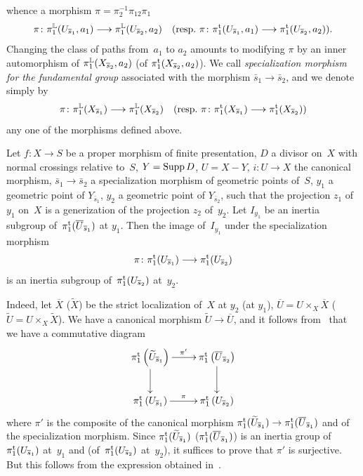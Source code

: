 whence a morphism $\pi=\pi_2^{-1}\pi_{12}\pi_1$
$$
\pi\colon \pi_1^{\LL}(U_{\bar{s}_1},a_1)\to
\pi_1^{\LL}(U_{\bar{s}_2},a_2) \quad (\text{\resp~}\pi\colon
\pi_1^\tame (U_{\bar{s}_1},a_1)\to \pi_1^\tame
(U_{\bar{s}_2},a_2)).
$$
Changing the class of paths from~$a_1$ to $a_2$ amounts to
modifying $\pi$ by an inner automorphism of
$\pi_1^{\mathbb{L}}(X_{\overline{s}_2},a_2)$ (\resp of
$\pi_1^{\mathrm{t}}(X_{\overline{s}_2},a_2)$). We call \emph{specialization
morphism for the fundamental group}
associated with the morphism $\bar{s}_1\to \bar{s}_2$, and we denote
simply by
$$
\pi\colon \pi_1^{\LL}(X_{\bar{s}_1})\to
\pi_1^{\LL}(X_{\bar{s}_2}) \quad \text{(\resp~} \pi\colon
\pi_1^{\tame}(X_{\bar{s}_1})\to \pi_1^{\tame}(X_{\bar{s}_2}))
$$
any one of the morphisms defined above.

\begin{lemma}
\label{XIII.2.11}
Let $f\colon X\to S$ be a proper morphism of
finite presentation, $D$ a divisor on~$X$ with normal
crossings relative to~$S$, $Y=\operatorname{Supp} D$, $U=X-Y$, $i\colon
U\to X$ the canonical morphism, $\bar{s}_1\to
\bar{s}_2$ a specialization morphism of geometric points
of~$S$, $y_1$ a geometric point of
$Y_{\bar{s}_1}$, $y_2$ a geometric point of
$Y_{\bar{s}_2}$, such that the projection $z_1$ of~$y_1$ on~$X$ is a
generization of the projection $z_2$ of~$y_2$. Let $I_{y_1}$
be an inertia subgroup of~$\pi_1^{\mathrm{t}}(\overline{U}_{\overline{s}_1})$ at
$y_1.$ Then the image of~$I_{y_{1}}$ under the
specialization morphism
$$
\pi\colon \pi_1^{\tame}(U_{\bar{s}_1})\to
\pi_1^{\tame}(U_{\bar{s}_2})
$$
is
an inertia subgroup of~$\pi_1^{\mathrm{t}}(U_{\overline{s}_2})$
at~$y_2$.
\end{lemma}

Indeed, let $\overline{X}$ (\resp $\widetilde{X}$) be the strict
localization of~$X$ at $y_2$ (\resp at $y_1$), $\overline{U}=U \times_X
\overline{X}$ (\resp $\widetilde{U}=U\times_X \widetilde{X}$). We have a
canonical morphism $\widetilde{U}\to \overline{U}$, and it
follows from~ that we have a commutative diagram
$$
\xymatrix{ \pi_1^{\tame} \left(\widetilde{U}_{\overline{s}_1} \right)
\ar[r]^{\pi '} \ar[d] & \pi_1^{\tame} \left(
\overline{U}_{\overline{s}_2} \right) \ar[d] \\ \pi_1^{\tame} \left(
U_{\overline{s}_1} \right) \ar[r]^{\pi } & \pi_1^{\tame} \left(
U_{\overline{s}_2} \right) }
$$
where $\pi'$ is the composite of the canonical morphism
$\pi_1^{\tame}(\widetilde{U}_ {\overline{s}_1})\to
\pi_1^{\tame}(\overline{U}_{\overline{s}_1})$ and of the
specialization morphism. Since
$\pi_1^{\mathrm{t}}(\widetilde{U}_{\overline{s}_1})$
(\resp $\pi_1^{\mathrm{t}}(\overline{U}_{\overline{s}_1})$)
is an inertia group of
$\pi_1^{\mathrm{t}}(U_{\overline{s}_1})$ at~$y_1$ and (\resp of~$\pi_1^{\mathrm{t}}(U_{\overline{s}_2})$ at~$y_2$), it suffices to
prove that $\pi'$ is surjective. But this follows from
the expression obtained in~.

